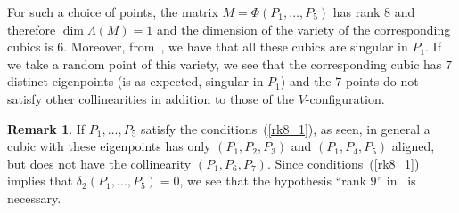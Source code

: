 \documentclass[a4paper, 11pt, reqno]{amsart}
\theoremstyle{plain}
\theoremstyle{definition}
\newtheorem{rmk}[lemma]{Remark}
\begin{document}
For such a choice
of points, the matrix $M = \Phi(P_1, \dots, P_5)$ has rank $8$
and therefore $\dim \Lambda(M) = 1$ and the dimension of the variety
of the corresponding cubics is $6$.
Moreover, from~, we have that all these cubics
are singular in $P_1$.
If we take a random point of this variety, we see that the corresponding
cubic has $7$ distinct eigenpoints (is as expected, singular in $P_1$) and the
$7$ points do not satisfy other collinearities in addition to those of the
$V$-configuration.

\begin{rmk}
\label{rmk:particular_cases}
If $P_1, \dots, P_5$ satisfy the conditions~(\ref{rk8_1}), as seen,
in general a cubic with these eigenpoints has only $(P_1, P_2, P_3)$ and $(P_1, P_4, P_5)$ aligned, but
does not have the collinearity $(P_1, P_6, P_7)$. Since conditions~(\ref{rk8_1})
implies that $\delta_2(P_1, \dots, P_5) = 0$, we see
that the hypothesis ``rank $9$''
in~ is necessary.
\end{rmk}
\end{document}
